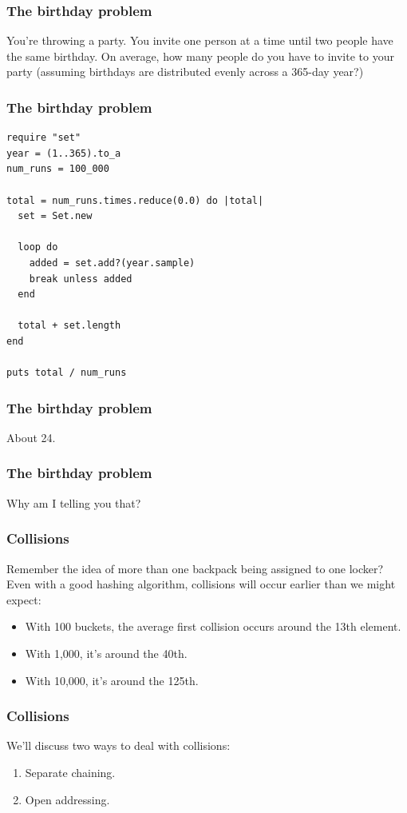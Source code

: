 \documentclass{beamer}
\begin{document}
\begin{frame}
    \frametitle{The birthday problem}

    You're throwing a party. You invite one person at a time until two people
    have the same birthday. On average, how many people do you have to invite
    to your party (assuming birthdays are distributed evenly across a 365-day
    year?)
\end{frame}

\begin{frame}[fragile]
    \frametitle{The birthday problem}
    \begin{lstlisting}
require "set"
year = (1..365).to_a
num_runs = 100_000

total = num_runs.times.reduce(0.0) do |total|
  set = Set.new
  
  loop do    
    added = set.add?(year.sample)
    break unless added
  end

  total + set.length
end

puts total / num_runs
    \end{lstlisting}
\end{frame}

\begin{frame}
    \frametitle{The birthday problem}

    About 24.
\end{frame}

\begin{frame}
    \frametitle{The birthday problem}

    Why am I telling you that?
\end{frame}

\begin{frame}
    \frametitle{Collisions}
    Remember the idea of more than one backpack being assigned to one locker?
    Even with a good hashing algorithm, collisions will occur earlier than we
    might expect:

    \begin{itemize}
        \item With 100 buckets, the average first collision occurs around the
              13th element.
        \item With 1,000, it's around the 40th. 
        \item With 10,000, it's around the 125th.
    \end{itemize}
\end{frame}

\begin{frame}
    \frametitle{Collisions}
    We'll discuss two ways to deal with collisions:

    \begin{enumerate}
        \item Separate chaining.
        \item Open addressing.
    \end{enumerate}
\end{frame}
\end{document}
